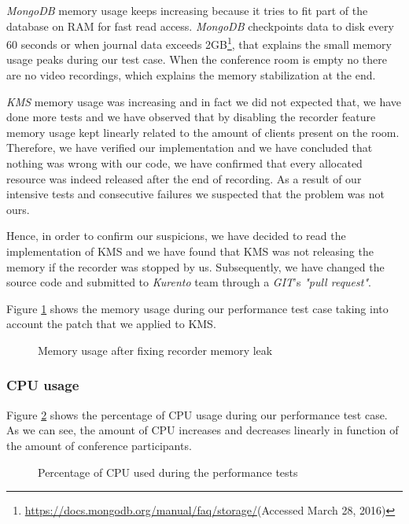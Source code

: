 \emph{MongoDB} memory usage keeps increasing because it tries to fit part of the database on \ac{RAM} for fast read access. \emph{MongoDB} checkpoints data to disk every 60 seconds or when journal data exceeds 2GB\footnote{\url{https://docs.mongodb.org/manual/faq/storage/}(Accessed March 28, 2016)}, that explains the small memory usage peaks during our test case. When the conference room is empty no there are no video recordings, which explains the memory stabilization at the end.

\emph{KMS} memory usage was increasing and in fact we did not expected that, we have done more tests and we have observed that by disabling the recorder feature memory usage kept linearly related to the amount of clients present on the room. Therefore, we have verified our implementation and we have concluded that nothing was wrong with our code, we have confirmed that every allocated resource was indeed released after the end of recording. As a result of our intensive tests and consecutive failures we suspected that the problem was not ours.

Hence, in order to confirm our suspicions, we have decided to read the implementation of \ac{KMS} and we have found that \ac{KMS} was not releasing the memory if the recorder was stopped by us. Subsequently, we have changed the source code and submitted to \emph{Kurento} team through a \emph{GIT}'s \emph{"pull request"}.


Figure \ref{fig:test_ram_fixed_mem} shows the memory usage during our performance test case taking into account the patch that we applied to \ac{KMS}.

\begin{figure}[!htb]
  \begin{center}
    
  \end{center}
  \caption{Memory usage after fixing recorder memory leak}
  \label{fig:test_ram_fixed_mem}
\end{figure}

\subsubsection{CPU usage}


Figure \ref{fig:test_full_features_cpu} shows the percentage of \ac{CPU} usage during our performance test case. As we can see, the amount of \ac{CPU} increases and decreases linearly in function of the amount of conference participants. 

\begin{figure}[!htb]
  \begin{center}
    
  \end{center}
  \caption{Percentage of CPU used during the performance tests}
  \label{fig:test_full_features_cpu}
\end{figure}

